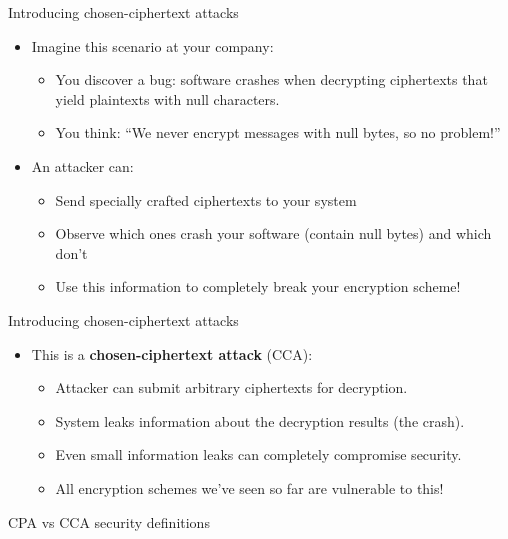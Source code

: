 \documentclass[aspectratio=169, lualatex, handout]{beamer}
\begin{document}
\begin{frame}{Introducing chosen-ciphertext attacks}
	\begin{itemize}
		\item Imagine this scenario at your company:
		      \begin{itemize}
			      \item You discover a bug: software crashes when decrypting ciphertexts that yield plaintexts with null characters.
			      \item You think: ``We never encrypt messages with null bytes, so no problem!''
		      \end{itemize}
		\item An attacker can:
		      \begin{itemize}
			      \item Send specially crafted ciphertexts to your system
			      \item Observe which ones crash your software (contain null bytes) and which don't
			      \item Use this information to completely break your encryption scheme!
		      \end{itemize}
	\end{itemize}
\end{frame}

\begin{frame}{Introducing chosen-ciphertext attacks}
	\begin{itemize}
		\item This is a \textbf{chosen-ciphertext attack} (CCA):
		      \begin{itemize}
			      \item Attacker can submit arbitrary ciphertexts for decryption.
			      \item System leaks information about the decryption results (the crash).
			      \item Even small information leaks can completely compromise security.
			      \item All encryption schemes we've seen so far are vulnerable to this!
		      \end{itemize}
	\end{itemize}
\end{frame}

\begin{frame}{CPA vs CCA security definitions}
	\begin{columns}[c]
		\begin{column}{0.5\textwidth}
		\end{column}
		\begin{column}{0.5\textwidth}
		\end{column}
	\end{columns}
\end{frame}
\end{document}

